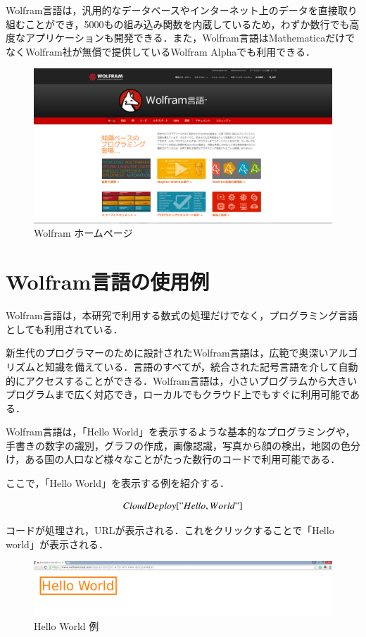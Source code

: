 Wolfram言語は，汎用的なデータベースやインターネット上のデータを直接取り組むことができ，5000もの組み込み関数を内蔵しているため，わずか数行でも高度なアプリケーションも開発できる．また，Wolfram言語はMathematicaだけでなくWolfram社が無償で提供しているWolfram Alphaでも利用できる．

\begin{figure}[h]
\centering
\includegraphics[width=15cm]{wolfram.png}
\caption{Wolfram ホームページ}\label{図}
\end{figure}

\clearpage

\section{Wolfram言語の使用例}

Wolfram言語は，本研究で利用する数式の処理だけでなく，プログラミング言語としても利用されている．

新生代のプログラマーのために設計されたWolfram言語は，広範で奥深いアルゴリズムと知識を備えている．言語のすべてが，統合された記号言語を介して自動的にアクセスすることができる．Wolfram言語は，小さいプログラムから大きいプログラムまで広く対応でき，ローカルでもクラウド上でもすぐに利用可能である．

Wolfram言語は，「Hello World」を表示するような基本的なプログラミングや，手書きの数字の識別，グラフの作成，画像認識，写真から顔の検出，地図の色分け，ある国の人口など様々なことがたった数行のコードで利用可能である．

ここで，「Hello World」を表示する例を紹介する．

\[CloudDeploy["Hello, World"]\]

コードが処理され，URLが表示される．これをクリックすることで「Hello world」が表示される．

\begin{figure}[h]
\centering
\includegraphics[width=15cm]{helloworld.png}
\caption{Hello World 例}\label{図}
\end{figure}

